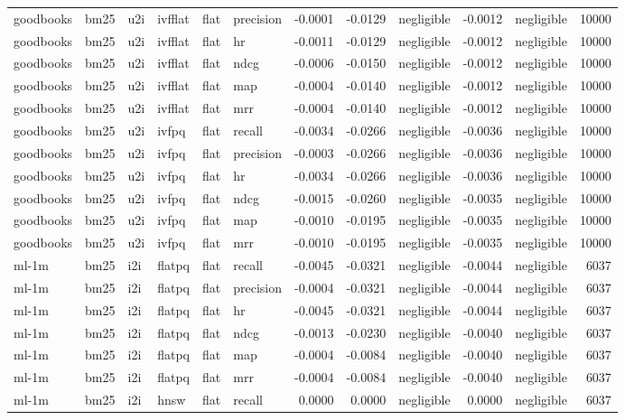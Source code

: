 \begin{tabular}{llllllrrlrlr}
goodbooks & bm25 & u2i & ivfflat & flat & precision & -0.0001 & -0.0129 & negligible & -0.0012 & negligible & 10000 \\
goodbooks & bm25 & u2i & ivfflat & flat & hr & -0.0011 & -0.0129 & negligible & -0.0012 & negligible & 10000 \\
goodbooks & bm25 & u2i & ivfflat & flat & ndcg & -0.0006 & -0.0150 & negligible & -0.0012 & negligible & 10000 \\
goodbooks & bm25 & u2i & ivfflat & flat & map & -0.0004 & -0.0140 & negligible & -0.0012 & negligible & 10000 \\
goodbooks & bm25 & u2i & ivfflat & flat & mrr & -0.0004 & -0.0140 & negligible & -0.0012 & negligible & 10000 \\
goodbooks & bm25 & u2i & ivfpq & flat & recall & -0.0034 & -0.0266 & negligible & -0.0036 & negligible & 10000 \\
goodbooks & bm25 & u2i & ivfpq & flat & precision & -0.0003 & -0.0266 & negligible & -0.0036 & negligible & 10000 \\
goodbooks & bm25 & u2i & ivfpq & flat & hr & -0.0034 & -0.0266 & negligible & -0.0036 & negligible & 10000 \\
goodbooks & bm25 & u2i & ivfpq & flat & ndcg & -0.0015 & -0.0260 & negligible & -0.0035 & negligible & 10000 \\
goodbooks & bm25 & u2i & ivfpq & flat & map & -0.0010 & -0.0195 & negligible & -0.0035 & negligible & 10000 \\
goodbooks & bm25 & u2i & ivfpq & flat & mrr & -0.0010 & -0.0195 & negligible & -0.0035 & negligible & 10000 \\
ml-1m & bm25 & i2i & flatpq & flat & recall & -0.0045 & -0.0321 & negligible & -0.0044 & negligible & 6037 \\
ml-1m & bm25 & i2i & flatpq & flat & precision & -0.0004 & -0.0321 & negligible & -0.0044 & negligible & 6037 \\
ml-1m & bm25 & i2i & flatpq & flat & hr & -0.0045 & -0.0321 & negligible & -0.0044 & negligible & 6037 \\
ml-1m & bm25 & i2i & flatpq & flat & ndcg & -0.0013 & -0.0230 & negligible & -0.0040 & negligible & 6037 \\
ml-1m & bm25 & i2i & flatpq & flat & map & -0.0004 & -0.0084 & negligible & -0.0040 & negligible & 6037 \\
ml-1m & bm25 & i2i & flatpq & flat & mrr & -0.0004 & -0.0084 & negligible & -0.0040 & negligible & 6037 \\
ml-1m & bm25 & i2i & hnsw & flat & recall & 0.0000 & 0.0000 & negligible & 0.0000 & negligible & 6037 \\

\end{tabular}

